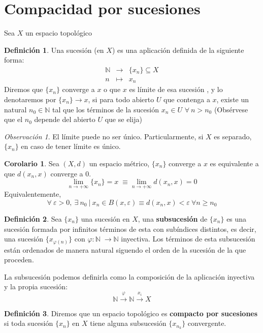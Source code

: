 \documentclass[12pt,twoside]{report}
\theoremstyle{azul}
\theoremstyle{azul2}
\theoremstyle{plain}
\theoremstyle{definition}
\newtheorem*{defi}{Definición}
\newtheorem*{cor}{Corolario}
\theoremstyle{remark}
\newtheorem*{obs}{Observación}
\begin{document}
\section{Compacidad por sucesiones}
Sea $X$ un espacio topológico
\begin{defi}
Una sucesión (en $X$) es una aplicación definida de la siguiente forma:
$$\begin{array}{rcl}
     \mathbb{N} & \longrightarrow & \{x_n\} \subseteq X\\
     n & \longmapsto & x_n
\end{array}$$
Diremos que $\{ x_n \}$ converge a $x$ o que $x$ es límite de esa sucesión , y lo denotaremos por $\{x_n\} \to x$, si para todo abierto $U$ que contenga a $x$, existe un natural $n_0 \in \mathbb{N}$ tal que los t{\'e}rminos de la sucesión $x_n \in U$ $\forall \: n > n_0$ (Obsérvese que el $n_0$ depende del abierto $U$ que se elija)
\end{defi}
\begin{obs}
El límite puede no ser {\'u}nico. Particularmente, si $X$ es separado, $\{ x_n \}$ en caso de tener límite es {\'u}nico.
\end{obs}
\begin{cor}
Sea $(X,d)$ un espacio m{\'e}trico, $\{ x_n \}$ converge a $x$ es equivalente a que $d(x_n,x)$ converge a 0.
$$\lim_{n \to +\infty} \{ x_n \} = x \; \equiv \lim_{n \to +\infty} d(x_n, x)=0$$
Equivalentemente, 
$$\forall \: \varepsilon > 0, \: \exists \: n_0 \: | \: x_n \in B(x, \varepsilon) \equiv d(x_n,x)  < \varepsilon \: \forall n \geq n_0$$
\end{cor}
\begin{defi}
Sea $\{x_n\}$ una sucesión en $X$, una \textbf{subsucesión} de $\{x_n\}$ es una sucesión formada por infinitos términos de esta con subíndices distintos, es decir, una sucesión $\{x_{\varphi(n)}\}$ con $\varphi: \mathbb{N} \; \rightarrow \mathbb{N}$ inyectiva. Los términos de esta subsucesión están ordenados de manera natural siguendo el orden de la sucesión de la que proceden.

La subsucesión podemos definirla como la composición de la aplicación inyectiva y la propia sucesión:
$$\mathbb{N} \overset{\varphi}{\longrightarrow} \mathbb{N} \overset{x_i}{\longrightarrow} X$$
\end{defi}
\begin{defi}
Diremos que un espacio topológico es \textbf{compacto por sucesiones} si toda sucesión $\{x_n\}$ en $X$ tiene alguna subsucesión $\{x_{n_k}\}$ convergente.
\end{defi}
\end{document}
